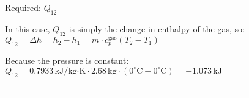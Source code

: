 \( \text{Required: } Q_{12} \)  

In this case, \( Q_{12} \) is simply the change in enthalpy of the gas, so:  
\( Q_{12} = \Delta h = h_2 - h_1 = m \cdot c_p^{\text{gas}} (T_2 - T_1) \)  

Because the pressure is constant:  
\( Q_{12} = 0.7933 \, \text{kJ/kg·K} \cdot 2.68 \, \text{kg} \cdot (0^\circ \text{C} - 0^\circ \text{C}) = -1.073 \, \text{kJ} \)  

---